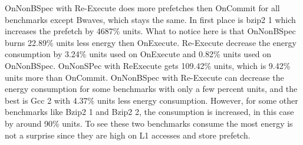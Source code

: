 OnNonBSpec with Re-Execute does more prefetches then OnCommit for all benchmarks except Bwaves, which stays the same. In first place is bzip2 1 which increases the prefetch by 4687\% units.
\resEnergy 
{}
What to notice here is that OnNonBSpec burns 22.89\% units less energy then
OnExecute. Re-Execute decrease the energy consumption by 3.24\% units used on
OnExecute and 0.82\% units used on OnNonBSpec. OnNonSPec with ReExecute gets
109.42\% units, which is 9.42\% units more than OnCommit.
OnNonBSpec with Re-Execute can decrease the energy consumption for some
benchmarks with only a few percent units, and the best is Gcc 2 with 4.37\% units
less energy consumption. However, for some other benchmarks like Bzip2 1 and
Bzip2 2, the consumption is increased, in this case by around 90\% units. To see
these two benchmarks consume the most energy is not a surprise since they are high
on L1 accesses and store prefetch.

